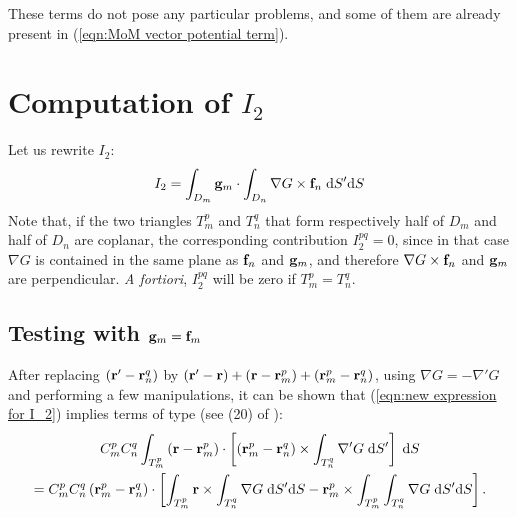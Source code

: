 These terms do not pose any particular problems, and some of them are already present in (\ref{eqn:MoM vector potential term}).

\section{Computation of $I_2$}
%
\par
Let us rewrite $I_2$:
\begin{equation} \label{eqn:new expression for I_2}
I_2 = \int_{D_m} \mathbf{g}_m \cdot \int_{D_n} \nabla G \times \mathbf{f}_n \; \text{d} S' \text{d} S 
\end{equation}
Note that, if the two triangles $T_m^p$ and $T_n^q$ that form respectively half of $D_m$ and half of $D_n$ are coplanar, the corresponding contribution $I_2^{pq} = 0$, since in that case $\nabla G$ is contained in the same plane as $\mathbf{f}_n$ and $\mathbf{g}_m$, and therefore $\nabla G \times \mathbf{f}_n$ and $\mathbf{g}_m$ are perpendicular. \textit{A fortiori}, $I_2^{pq}$ will be zero if $T_m^p = T_n^q$.

\subsection{Testing with $\mathbf{g}_m = \mathbf{f}_m$}
%
\par
After replacing $\left(\mathbf{r}' - \mathbf{r}_n^q\right)$ by $\left(\mathbf{r}' - \mathbf{r}\right) + \left(\mathbf{r} - \mathbf{r}_m^p\right) + \left(\mathbf{r}_m^p - \mathbf{r}_n^q\right)$, using $\nabla G = -\nabla' G$ and performing a few manipulations, it can be shown that (\ref{eqn:new expression for I_2}) implies terms of type (see (20) of \cite{Taskinen_03}):
\begin{multline} \label{eqn:G_HJ_fs_testing_decomposition}
C_m^p C_n^q \int_{T_m^p} \left(\mathbf{r} - \mathbf{r}_m^p \right) \cdot \left[\left(\mathbf{r}_m^p - \mathbf{r}_n^q\right) \times \int_{T_n^q} \nabla' G \; \text{d} S'\right] \; \text{d} S \\
=C_m^p C_n^q \left(\mathbf{r}_m^p - \mathbf{r}_n^q\right) \cdot \left[\int_{T_m^p} \mathbf{r} \times \int_{T_n^q} \nabla G \; \text{d} S' \text{d} S - \mathbf{r}_m^p \times \int_{T_m^p} \int_{T_n^q}\nabla G \; \text{d} S' \text{d} S \right].
\end{multline}

